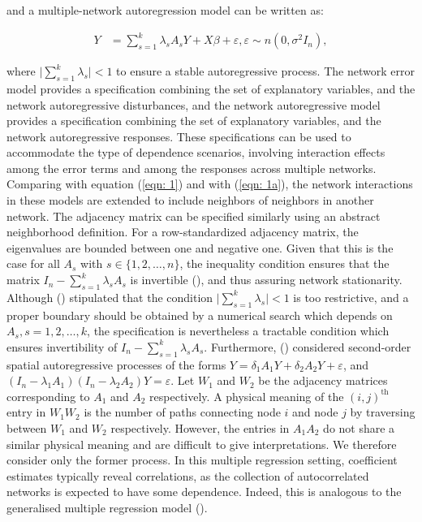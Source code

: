 \documentclass[times, doublespace]{auth}
\begin{document}
\noindent and a multiple-network autoregression model can be written as:

\begin{equation}
\label{eqn: 2a}
\begin{array}{rl}
Y &= \sum\limits_{s=1}^{k} \lambda_{s}A_{s} Y + X\beta + \varepsilon, \varepsilon \sim n(0, \sigma^{2}I_{n}),
\end{array}
\end{equation}

\noindent where $\vert \sum\limits_{s=1}^{k} \lambda_{s}\vert < 1$ to ensure a stable autoregressive process. The network error model provides a specification combining the set of explanatory variables, and the network autoregressive disturbances, and the network autoregressive model provides a specification combining the set of explanatory variables, and the network autoregressive responses. These specifications can be used to accommodate the type of dependence scenarios, involving interaction effects among the error terms and among the responses across multiple networks. Comparing with equation (\ref{eqn: 1}) and with (\ref{eqn: 1a}), the network interactions in these models are extended to include neighbors of neighbors in another network. The adjacency matrix can be specified similarly using an abstract neighborhood definition. For a row-standardized adjacency matrix, the eigenvalues are bounded between one and negative one. Given that this is the case for all $A_{s}$ with $s \in \{1,2,\ldots,n\}$, the inequality condition ensures that the matrix $I_{n} - \sum\limits_{s=1}^{k} \lambda_{s}A_{s}$ is invertible (\cite{R38}), and thus assuring network stationarity. Although (\cite{R42}) stipulated that the condition $\vert \sum_{s=1}^{k} \lambda_{s}\vert < 1$ is too restrictive, and a proper boundary should be obtained by a numerical search which depends on $A_{s}, s=1,2,\ldots,k$, the specification is nevertheless a tractable condition which ensures invertibility of $I_{n} - \sum_{s=1}^{k}\lambda_{s}A_{s}$. Furthermore, (\cite{R42}) considered second-order spatial autoregressive processes of the forms $Y= \delta_{1}A_{1}Y + \delta_{2}A_{2}Y + \varepsilon$, and $(I_{n} - \lambda_{1}A_{1})(I_{n} - \lambda_{2}A_{2})Y = \varepsilon$. Let $W_{1}$ and $W_{2}$ be the adjacency matrices corresponding to $A_{1}$ and $A_{2}$ respectively. A physical meaning of the $(i,j)^{\text{th}}$ entry in $W_{1}W_{2}$ is the number of paths connecting node $i$ and node $j$ by traversing between $W_{1}$ and $W_{2}$ respectively. However, the entries in $A_{1}A_{2}$ do not share a similar physical meaning and are difficult to give interpretations. We therefore consider only the former process. In this multiple regression setting, coefficient estimates typically reveal correlations, as the collection of autocorrelated networks is expected to have some dependence. Indeed, this is analogous to the generalised multiple regression model (\cite{R39}).
\newline
\end{document}
